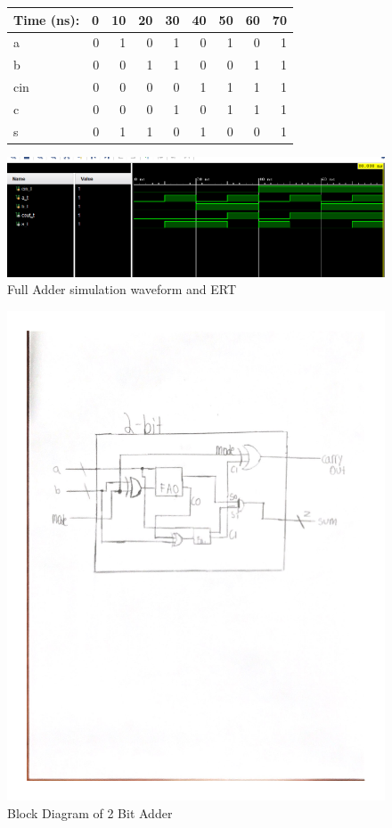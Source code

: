 \documentclass[11pt]{article}
\begin{document}
\begin{figure}[ht]\centering
	\begin{tabular}{l|rrrrrrrr}
		Time (ns): & 0 & 10 & 20 & 30 & 40 & 50 & 60 & 70 \\
		\midrule 
		a &  0 & 1 & 0 & 1 & 0 & 1 & 0 & 1 \\
		b & 0 & 0 & 1 & 1 & 0 & 0 & 1 & 1\\
		cin & 0 & 0 & 0 & 0 & 1 & 1 & 1 & 1 \\
		\midrule
		c & 0 & 0 & 0 & 1 & 0 & 1 & 1 & 1 \\
		s & 0 & 1 & 1 & 0 & 1 & 0 & 0 & 1 \\ \bottomrule
	\end{tabular}\medskip
	
	\includegraphics[width=1.0\textwidth]{FullAdderWaveReal}
	\caption{Full Adder simulation waveform and ERT}
	\label{fig:sim_with_table}
\end{figure}

\clearpage

\begin{figure}
	\includegraphics[width=1.0\textwidth]{"2BitAdderDia"}
	\caption{Block Diagram of 2 Bit Adder}
\end{figure}
\clearpage
\end{document}
